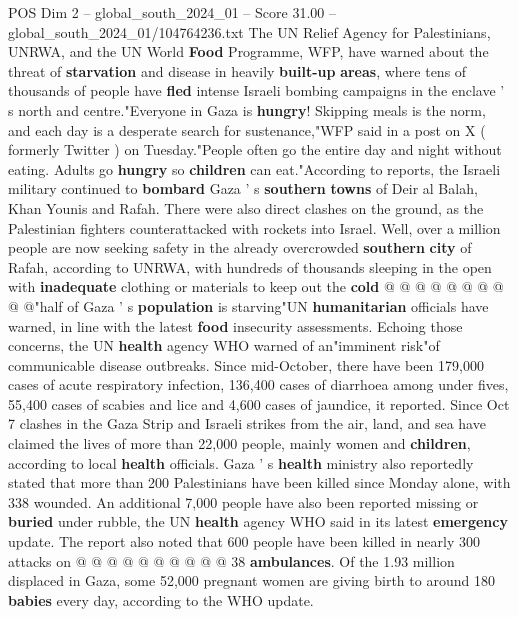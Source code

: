 \begin{textsample}{POS Dim 2 – global\_south\_2024\_01 – Score 31.00 – global\_south\_2024\_01/104764236.txt}  \label{ex:f2_pos_124}
The UN Relief Agency for Palestinians, UNRWA, and the UN World \textbf{Food} Programme, WFP, have warned about the threat of \textbf{starvation} and disease in heavily \textbf{built-up} \textbf{areas}, where tens of thousands of people have \textbf{fled} intense Israeli bombing campaigns in the enclave ' s north and centre."Everyone in Gaza is \textbf{hungry}!
Skipping meals is the norm, and each day is a desperate search for sustenance,"WFP said in a post on X ( formerly Twitter ) on Tuesday."People often go the entire day and night without eating.
Adults go \textbf{hungry} so \textbf{children} can eat."According to reports, the Israeli military continued to \textbf{bombard} Gaza ' s \textbf{southern} \textbf{towns} of Deir al Balah, Khan Younis and Rafah.
There were also direct clashes on the ground, as the Palestinian fighters counterattacked with rockets into Israel.
Well, over a million people are now seeking safety in the already overcrowded \textbf{southern} \textbf{city} of Rafah, according to UNRWA, with hundreds of thousands sleeping in the open with \textbf{inadequate} clothing or materials to keep out the \textbf{cold} @ @ @ @ @ @ @ @ @ @"half of Gaza ' s \textbf{population} is starving"UN \textbf{humanitarian} officials have warned, in line with the latest \textbf{food} insecurity assessments.
Echoing those concerns, the UN \textbf{health} agency WHO warned of an"imminent risk"of communicable disease outbreaks.
Since mid-October, there have been 179,000 cases of acute respiratory infection, 136,400 cases of diarrhoea among under fives, 55,400 cases of scabies and lice and 4,600 cases of jaundice, it reported.
Since Oct 7 clashes in the Gaza Strip and Israeli strikes from the air, land, and sea have claimed the lives of more than 22,000 people, mainly women and \textbf{children}, according to local \textbf{health} officials.
Gaza ' s \textbf{health} ministry also reportedly stated that more than 200 Palestinians have been killed since Monday alone, with 338 wounded.
An additional 7,000 people have also been reported missing or \textbf{buried} under rubble, the UN \textbf{health} agency WHO said in its latest \textbf{emergency} update.
The report also noted that 600 people have been killed in nearly 300 attacks on @ @ @ @ @ @ @ @ @ @ 38 \textbf{ambulances}.
Of the 1.93 million displaced in Gaza, some 52,000 pregnant women are giving birth to around 180 \textbf{babies} every day, according to the WHO update.

\end{textsample}
